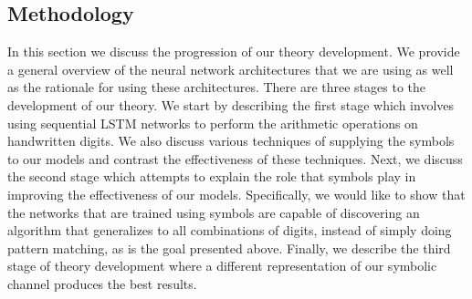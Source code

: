 \subsection{Methodology} \label{sec:theory-approach-methodology}

In this section we discuss the progression of our theory development. We provide a general overview of the neural network architectures that we are using as well as the rationale for using these architectures. There are three stages to the development of our theory. We start by describing the first stage which involves using sequential LSTM networks to perform the arithmetic operations on handwritten digits. We also discuss various techniques of supplying the symbols to our models and contrast the effectiveness of these techniques. Next, we discuss the second stage which attempts to explain the role that symbols play in improving the effectiveness of our models. Specifically, we would like to show that the networks that are trained using symbols are capable of discovering an algorithm that generalizes to all combinations of digits, instead of simply doing pattern matching, as is the goal presented above. Finally, we describe the third stage of theory development where a different representation of our symbolic channel produces the best results.







